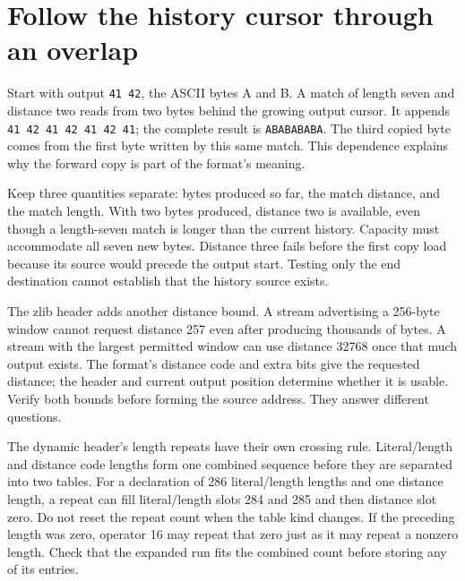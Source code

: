 \section{Follow the history cursor through an overlap}
Start with output \texttt{41 42}, the ASCII bytes A and B. A match of length seven
and distance two reads from two bytes behind the growing output cursor. It appends
\texttt{41 42 41 42 41 42 41}; the complete result is \texttt{ABABABABA}. The third
copied byte comes from the first byte written by this same match. This dependence
explains why the forward copy is part of the format's meaning.

Keep three quantities separate: bytes produced so far, the match distance, and the
match length. With two bytes produced, distance two is available, even though a
length-seven match is longer than the current history. Capacity must accommodate all
seven new bytes. Distance three fails before the first copy load because its source
would precede the output start. Testing only the end destination cannot establish that
the history source exists.

The zlib header adds another distance bound. A stream advertising a 256-byte window
cannot request distance 257 even after producing thousands of bytes. A stream with
the largest permitted window can use distance 32768 once that much output exists.
The format's distance code and extra bits give the requested distance; the header
and current output position determine whether it is usable. Verify both bounds before
forming the source address. They answer different questions.

The dynamic header's length repeats have their own crossing rule. Literal/length and
distance code lengths form one combined sequence before they are separated into two
tables. For a declaration of 286 literal/length lengths and one distance length, a
repeat can fill literal/length slots 284 and 285 and then distance slot zero. Do not
reset the repeat count when the table kind changes. If the preceding length was zero,
operator 16 may repeat that zero just as it may repeat a nonzero length. Check that the
expanded run fits the combined count before storing any of its entries.
